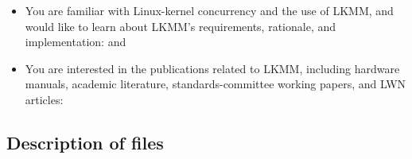 \begin{itemize}
  \item You are familiar with Linux-kernel concurrency and the use
	of LKMM, and would like to learn about LKMM's requirements,
	rationale, and implementation:
	\hyperref[sec:docs:Explanation of the Linux-Kernel Memory Consistency Model]{
	  }
	and \hyperref[sec:docs:Herd representation]{
	  }

  \item You are interested in the publications related to LKMM, including
	hardware manuals, academic literature, standards-committee
	working papers, and LWN articles:
	\hyperref[sec:docs:References]{
	  }
\end{itemize}


\subsection{Description of files}

